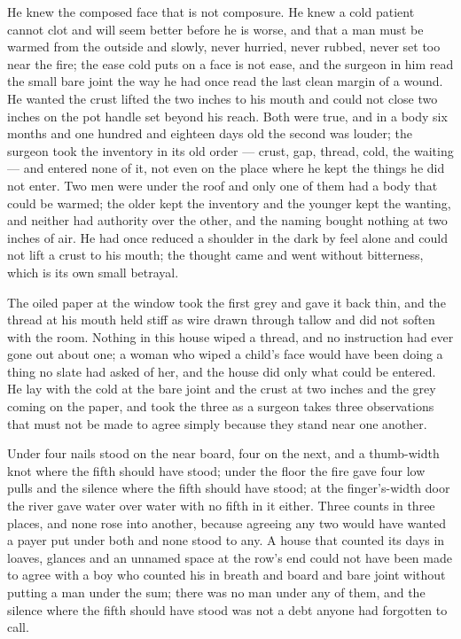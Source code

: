 He knew the composed face that is not composure. He knew a cold patient cannot clot and will seem better before he is worse, and that a man must be warmed from the outside and slowly, never hurried, never rubbed, never set too near the fire; the ease cold puts on a face is not ease, and the surgeon in him read the small bare joint the way he had once read the last clean margin of a wound. He wanted the crust lifted the two inches to his mouth and could not close two inches on the pot handle set beyond his reach. Both were true, and in a body six months and one hundred and eighteen days old the second was louder; the surgeon took the inventory in its old order --- crust, gap, thread, cold, the waiting --- and entered none of it, not even on the place where he kept the things he did not enter. Two men were under the roof and only one of them had a body that could be warmed; the older kept the inventory and the younger kept the wanting, and neither had authority over the other, and the naming bought nothing at two inches of air. He had once reduced a shoulder in the dark by feel alone and could not lift a crust to his mouth; the thought came and went without bitterness, which is its own small betrayal.

The oiled paper at the window took the first grey and gave it back thin, and the thread at his mouth held stiff as wire drawn through tallow and did not soften with the room. Nothing in this house wiped a thread, and no instruction had ever gone out about one; a woman who wiped a child's face would have been doing a thing no slate had asked of her, and the house did only what could be entered. He lay with the cold at the bare joint and the crust at two inches and the grey coming on the paper, and took the three as a surgeon takes three observations that must not be made to agree simply because they stand near one another.

Under  four nails stood on the near board, four on the next, and a thumb-width knot where the fifth should have stood; under the floor the fire gave four low pulls and the silence where the fifth should have stood; at the finger's-width door the river gave water over water with no fifth in it either. Three counts in three places, and none rose into another, because agreeing any two would have wanted a payer put under both and none stood to any. A house that counted its days in loaves, glances and an unnamed space at the row's end could not have been made to agree with a boy who counted his in breath and board and bare joint without putting a man under the sum; there was no man under any of them, and the silence where the fifth should have stood was not a debt anyone had forgotten to call.

